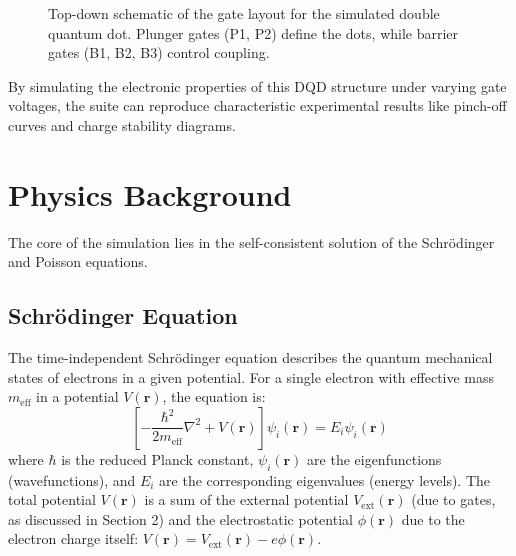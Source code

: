 \documentclass{article}
\begin{document}
\begin{figure}[h!]
\begin{tikzpicture}[scale=0.8]
    \end{tikzpicture}
    \caption{Top-down schematic of the gate layout for the simulated double quantum dot. Plunger gates (P1, P2) define the dots, while barrier gates (B1, B2, B3) control coupling.}
    \label{fig:gate_layout}
\end{figure}

By simulating the electronic properties of this DQD structure under varying gate voltages, the suite can reproduce characteristic experimental results like pinch-off curves and charge stability diagrams.

\section{Physics Background}
The core of the simulation lies in the self-consistent solution of the Schrödinger and Poisson equations.

\subsection{Schrödinger Equation}
The time-independent Schrödinger equation describes the quantum mechanical states of electrons in a given potential. For a single electron with effective mass $m_{\text{eff}}$ in a potential $V(\mathbf{r})$, the equation is:
\begin{equation}
    \left[ -\frac{\hbar^2}{2m_{\text{eff}}} \nabla^2 + V(\mathbf{r}) \right] \psi_i(\mathbf{r}) = E_i \psi_i(\mathbf{r})
\end{equation}
where $\hbar$ is the reduced Planck constant, $\psi_i(\mathbf{r})$ are the eigenfunctions (wavefunctions), and $E_i$ are the corresponding eigenvalues (energy levels). The total potential $V(\mathbf{r})$ is a sum of the external potential $V_{\text{ext}}(\mathbf{r})$ (due to gates, as discussed in Section 2) and the electrostatic potential $\phi(\mathbf{r})$ due to the electron charge itself: $V(\mathbf{r}) = V_{\text{ext}}(\mathbf{r}) - e \phi(\mathbf{r})$.
\end{document}
